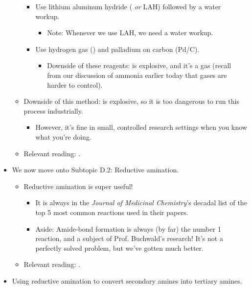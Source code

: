 \documentclass[../notes.tex]{subfiles}
\begin{document}
\begin{itemize}
\begin{itemize}
        \begin{itemize}
            \item Use lithium aluminum hydride ( \emph{or} LAH) followed by a water workup.
            \begin{itemize}
                \item Note: Whenever we use LAH, we need a water workup.
            \end{itemize}
            \item Use hydrogen gas () and palladium on carbon (Pd/C).
            \begin{itemize}
                \item Downside of these reagents:  is explosive, and it's a gas (recall from our discussion of ammonia earlier today that gases are harder to control).
            \end{itemize}
        \end{itemize}
        \item Downside of this method:  is explosive, so it is too dangerous to run this process industrially.
        \begin{itemize}
            \item However, it's fine in small, controlled research settings when you know what you're doing.
        \end{itemize}
        \item Relevant reading: \textcite[354]{bib:Clayden}.
    \end{itemize}
    \item We now move onto Subtopic D.2: Reductive amination.
    \begin{itemize}
        \item Reductive amination is super useful!
        \begin{itemize}
            \item It is always in the \emph{Journal of Medicinal Chemistry}'s decadal list of the top 5 most common reactions used in their papers.
            \item Aside: Amide-bond formation is always (by far) the number 1 reaction, and a subject of Prof. Buchwald's research! It's not a perfectly solved problem, but we've gotten much better.
        \end{itemize}
        \item Relevant reading: \textcite[234-235]{bib:Clayden}.
    \end{itemize}
    \pagebreak
    \item Using reductive amination to convert secondary amines into tertiary amines.

\end{itemize}
\end{document}
